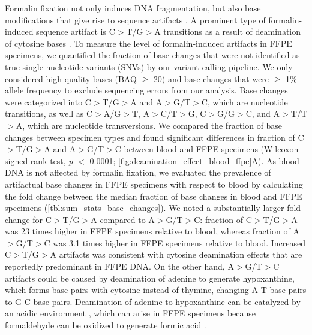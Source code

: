 Formalin fixation not only induces DNA fragmentation, but also base modifications that give rise to sequence artifacts \cite{Do2012, Do2013, Do2015a, Kim2017, Hofreiter2001, Wong2014, Ofner2017, Oh2015}. A prominent type of formalin-induced sequence artifact is C$>$T/G$>$A transitions as a result of deamination of cytosine bases \cite{Do2015a, Kim2017, Wong2014, Oh2015, Lin2014}. To measure the level of formalin-induced artifacts in FFPE specimens, we quantified the fraction of base changes that were not identified as true single nucleotide variants (\acs{SNV}s) by our variant calling pipeline. We only considered high quality bases (BAQ $\geq$ 20) and base changes that were $\geq$ 1\% allele frequency to exclude sequencing errors from our analysis. Base changes were categorized into C$>$T/G$>$A and A$>$G/T$>$C, which are nucleotide transitions, as well as C$>$A/G$>$T, A$>$C/T$>$G, C$>$G/G$>$C, and A$>$T/T$>$A, which are nucleotide transversions. We compared the fraction of base changes between specimen types and found significant differences in fraction of C$>$T/G$>$A and A$>$G/T$>$C between blood and FFPE specimens (Wilcoxon signed rank test, \textit{p} $<$ 0.0001; \autoref{fig:deamination_effect_blood_ffpe}A). As blood DNA is not affected by formalin fixation, we evaluated the prevalence of artifactual base changes in FFPE specimens with respect to blood by calculating the fold change between the median fraction of base changes in blood and FFPE specimens (\autoref{tbl:sum_stats_base_changes}). We noted a substantially larger fold change for C$>$T/G$>$A compared to A$>$G/T$>$C: fraction of C$>$T/G$>$A was 23 times higher in FFPE specimens relative to blood, whereas fraction of A$>$G/T$>$C was 3.1 times higher in FFPE specimens relative to blood. Increased C$>$T/G$>$A artifacts was consistent with cytosine deamination effects that are reportedly predominant in FFPE DNA. On the other hand, A$>$G/T$>$C artifacts could be caused by deamination of adenine to generate hypoxanthine, which forms base pairs with cytosine instead of thymine, changing A-T base pairs to G-C base pairs. Deamination of adenine to hypoxanthine can be catalyzed by an acidic environment \cite{Wang2010}, which can arise in FFPE specimens because formaldehyde can be oxidized to generate formic acid \cite{Do2015a}.

